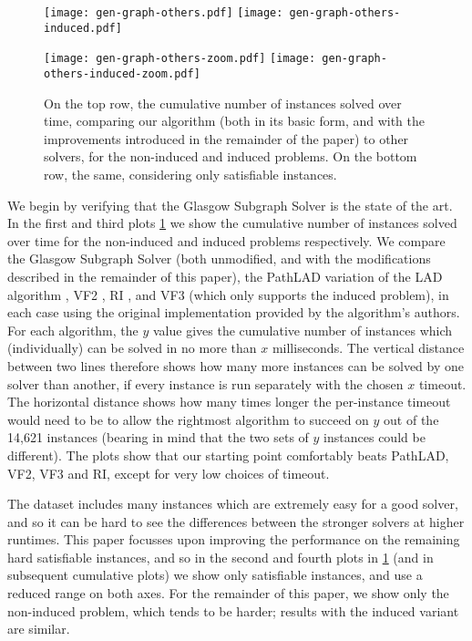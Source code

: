 \documentclass[runningheads]{llncs}
\begin{document}
\begin{figure}[tb]
    \texttt{[image: gen-graph-others.pdf]}
    \hfill
    \texttt{[image: gen-graph-others-induced.pdf]}

    \bigskip

    \texttt{[image: gen-graph-others-zoom.pdf]}
    \hfill
    \texttt{[image: gen-graph-others-induced-zoom.pdf]}

    \caption{On the top row, the cumulative number of instances solved over time, comparing our algorithm
    (both in its basic form, and with the improvements introduced in the remainder of the paper) to
    other solvers, for the non-induced and induced problems. On the bottom row, the same,
    considering only satisfiable instances.}
    \label{figure:others}
\end{figure}

We begin by verifying that the Glasgow Subgraph Solver is the state of the art. In the first and
third plots \cref{figure:others} we show the cumulative number of instances solved over time for the
non-induced and induced problems respectively. We compare the Glasgow Subgraph Solver (both
unmodified, and with the modifications described in the remainder of this paper), the PathLAD
variation of the LAD algorithm \cite{DBLP:journals/ai/Solnon10,DBLP:conf/lion/KotthoffMS16}, VF2
\cite{DBLP:journals/pami/CordellaFSV04}, RI \cite{DBLP:journals/bmcbi/BonniciGPSF13}, and VF3
\cite{DBLP:conf/gbrpr/CarlettiFSV17} (which only supports the induced problem), in each case using
the original implementation provided by the algorithm's authors. For each algorithm, the $y$ value
gives the cumulative number of instances which (individually) can be solved in no more than $x$
milliseconds.  The vertical distance between two lines therefore shows how many more instances can
be solved by one solver than another, if every instance is run separately with the chosen $x$
timeout. The horizontal distance shows how many times longer the per-instance timeout would need to
be to allow the rightmost algorithm to succeed on $y$ out of the 14,621 instances (bearing in mind
that the two sets of $y$ instances could be different).  The plots show that our starting point
comfortably beats PathLAD, VF2, VF3 and RI, except for very low choices of timeout.

The dataset includes many instances which are extremely easy for a good solver, and so it can be
hard to see the differences between the stronger solvers at higher runtimes. This paper focusses
upon improving the performance on the remaining hard satisfiable instances, and so in the second and
fourth plots in \cref{figure:others} (and in subsequent cumulative plots) we show only satisfiable
instances, and use a reduced range on both axes.  For the remainder of this paper, we show only
the non-induced problem, which tends to be harder; results with the induced variant are similar.
\end{document}
